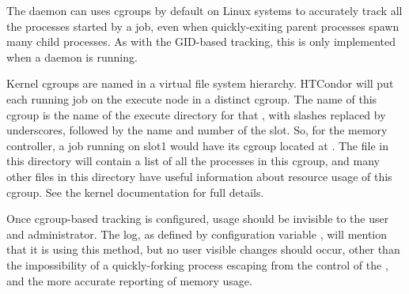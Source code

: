 The  daemon can uses cgroups by default on Linux systems
to accurately track all the processes started by a job, 
even when quickly-exiting parent processes spawn many child processes.
As with the GID-based tracking, this is only implemented when a 
 daemon is running.  

Kernel cgroups are named in a virtual file system hierarchy. 
HTCondor will put each running job on the execute node in a distinct cgroup.
The name of this cgroup is the name of the execute directory for 
that , with slashes replaced by underscores, 
followed by the name and number of the slot.  
So, for the memory controller, 
a job running on slot1 would have its cgroup located at
.  
The  file in this directory will contain a list 
of all the processes in this cgroup, and
many other files in this directory have useful information about resource usage
of this cgroup.  See the kernel documentation for full details.

Once cgroup-based tracking is configured, 
usage should be invisible to the user and administrator.  
The  log, as defined by configuration variable
, 
will mention that it is using this method, 
but no user visible changes should occur,
other than the impossibility of a quickly-forking process escaping from the
control of the ,
and the more accurate reporting of memory usage.
